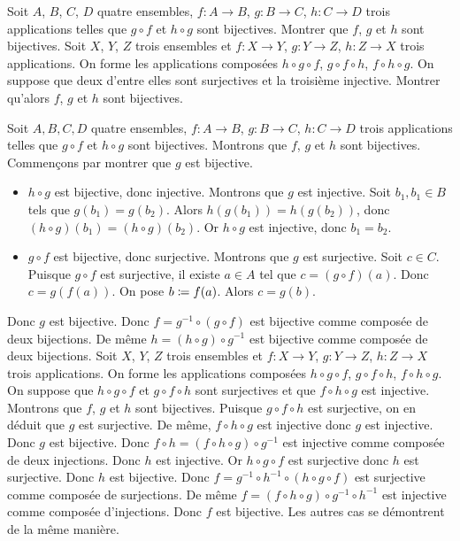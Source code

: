 \documentclass{magnolia}
\begin{document}
\begin{questions}
\question Soit $A$, $B$, $C$, $D$ quatre ensembles, $f:A\rightarrow B$,
  $g:B\rightarrow C$, $h:C\rightarrow D$ trois applications telles que $g\circ f$
  et $h\circ g$ sont bijectives. Montrer que $f$, $g$ et $h$ sont bijectives.
\question Soit $X$, $Y$, $Z$ trois ensembles et  $f:X\rightarrow Y$,
  $g:Y\rightarrow Z$, $h:Z\rightarrow X$ trois applications. On forme les
  applications composées $h\circ g\circ f$, $g\circ f\circ h$,
  $f\circ h\circ g$. On suppose que deux d'entre elles sont surjectives et la
  troisième injective. Montrer qu'alors $f$, $g$ et $h$ sont bijectives.
\end{questions}
\begin{sol}
\begin{questions}
\question  Soit $A,B,C,D$ quatre ensembles, $f:A\rightarrow B$,
  $g:B\rightarrow C$, $h:C\rightarrow D$ trois applications telles que $g\circ f$
  et $h\circ g$ sont bijectives. Montrons que $f$, $g$ et $h$ sont bijectives. Commençons par montrer que $g$ est bijective.
  \begin{itemize}
  \item $h\circ g$ est bijective, donc injective. Montrons que $g$ est injective. Soit $b_1,b_1\in B$ tels que $g(b_1)=g(b_2)$. Alors $h(g(b_1))=h(g(b_2))$, donc $(h\circ g)(b_1)=(h\circ g)(b_2)$. Or $h\circ g$ est injective, donc $b_1=b_2$.
  \item $g\circ f$ est bijective, donc surjective. Montrons que $g$ est surjective. Soit $c\in C$. Puisque $g\circ f$ est surjective, il existe $a\in A$ tel que $c=(g\circ f)(a)$. Donc $c=g(f(a))$. On pose $b\coloneqq f(a)$. Alors $c=g(b)$.
  \end{itemize}
  Donc $g$ est bijective. Donc $f=g^{-1} \circ (g\circ f)$ est bijective comme composée de deux bijections. De même $h=(h\circ g)\circ g^{-1}$ est bijective comme composée de deux bijections.
\question Soit $X$, $Y$, $Z$ trois ensembles et  $f:X\rightarrow Y$,
  $g:Y\rightarrow Z$, $h:Z\rightarrow X$ trois applications. On forme les
  applications composées $h\circ g\circ f$, $g\circ f\circ h$,
  $f\circ h\circ g$. On suppose que $h\circ g\circ f$ et $g\circ f\circ h$ sont surjectives et que $f\circ h\circ g$ est injective. Montrons que $f$, $g$ et $h$ sont bijectives. Puisque $g\circ f\circ h$ est surjective, on en déduit que $g$ est surjective. De même, $f\circ h\circ g$ est injective donc $g$ est injective. Donc $g$ est bijective. Donc $f\circ h=(f\circ h\circ g)\circ g^{-1}$ est injective comme composée de deux injections. Donc $h$ est injective. Or $h\circ g\circ f$ est surjective donc $h$ est surjective. Donc $h$ est bijective. Donc $f=g^{-1}\circ h^{-1}\circ(h\circ g\circ f)$ est surjective comme composée de surjections. De même $f=(f\circ h\circ g)\circ g^{-1} \circ h^{-1}$ est injective comme composée d'injections. Donc $f$ est bijective. Les autres cas se démontrent de la même manière.
\end{questions}
\end{sol}
\end{document}
